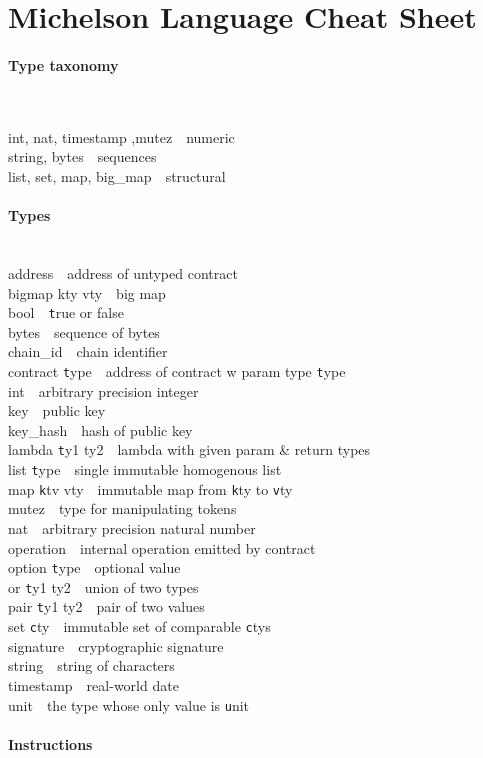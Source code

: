 \documentclass[10pt]{article}
\newcommand{\command}[2]{#1~\dotfill{}~#2\\} %
\newcommand{\sectiontitle}[1]{\paragraph{#1} \ \\} %
\begin{document}
\setlength\topsep{0pt}\setlength\partopsep{0pt}\setlength\parskip{0pt}
\section*{Michelson Language Cheat Sheet}
\begin{multicols}{3}
  \sectiontitle{Type taxonomy}\noindent\begin{raggedright}
    \command{int, nat, timestamp ,mutez}{numeric}
    \command{string, bytes}{sequences}
    \command{list, set, map, big\_map}{structural}
  \end{raggedright}
  \sectiontitle{Types}
  \noindent
  \command{address}{address of untyped contract}
  \command{bigmap kty vty}{big map}
  \command{bool}{{\texttt true} or false}
  \command{bytes}{sequence of bytes}
  \command{chain\_id}{chain identifier}
  \command{contract {\texttt type}}{address of contract w param type {\texttt type}}
  \command{int}{arbitrary precision integer}
  \command{key}{public key}
  \command{key\_hash}{hash of public key}
  \command{lambda {\texttt ty1 ty2}}{lambda with given param \& return types}
  \command{list {\texttt type}}{single immutable homogenous list}
  \command{map {\texttt ktv vty}}{immutable map from {\texttt kty} to {\texttt vty}}
  \command{mutez}{type for manipulating tokens}
  \command{nat}{arbitrary precision natural number}
  \command{operation}{internal operation emitted by contract}
  \command{option {\texttt type}}{optional value}
  \command{or {\texttt ty1 ty2}}{union of two types}
  \command{pair {\texttt ty1 ty2}}{pair of two values}
  \command{set {\texttt cty}}{immutable set of comparable {\texttt cty}s}
  \command{signature}{cryptographic signature}
  \command{string}{string of characters}
  \command{timestamp}{real-world date}
  \command{unit}{the type whose only value is {\texttt unit}}
  \sectiontitle{Instructions}\begin{flushright}\noindent\end{flushright}
\end{multicols}

\end{document}
